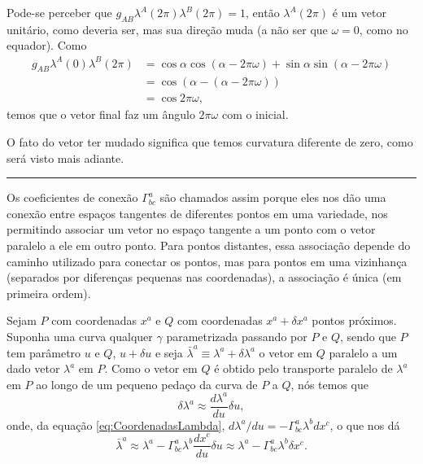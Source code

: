 \begin{exemplo}
Pode-se perceber que $g_{A B} \lambda^{A}(2 \pi) \lambda^{B}(2 \pi)=1$, então $\lambda^A(2\pi)$ é um vetor unitário, como deveria ser, mas sua direção muda (a não ser que $\omega=0$, como no equador). Como
\[
\begin{aligned} g_{A B} \lambda^{A}(0) \lambda^{B}(2 \pi) &=\cos \alpha \cos (\alpha-2 \pi \omega)+\sin \alpha \sin (\alpha-2 \pi \omega) \\ &=\cos (\alpha-(\alpha-2 \pi \omega)) \\ &=\cos 2 \pi \omega ,\end{aligned}
\]
temos que o vetor final faz um ângulo $2\pi\omega$ com o inicial.

O fato do vetor ter mudado significa que temos curvatura diferente de zero, como será visto mais adiante.

\noindent
\rule{\textwidth}{0.4pt}
\end{exemplo}

Os coeficientes de conexão $\Gamma^a_{bc}$ são chamados assim porque eles nos dão uma conexão entre espaços tangentes de diferentes pontos em uma variedade, nos permitindo associar um vetor no espaço tangente a um ponto com o vetor paralelo a ele em outro ponto. Para pontos distantes, essa associação depende do caminho utilizado para conectar os pontos, mas para pontos em uma vizinhança (separados por diferenças pequenas nas coordenadas), a associação é única (em primeira ordem).

Sejam $P$ com coordenadas $x^a$ e $Q$ com coordenadas $x^a+\delta x^a$ pontos próximos. Suponha uma curva qualquer $\gamma$ parametrizada passando por $P$ e $Q$, sendo que $P$ tem parâmetro $u$ e $Q$, $u+\delta u$ e seja $\bar{\lambda}^a\equiv\lambda^a + \delta\lambda^a$ o vetor em $Q$ paralelo a um dado vetor $\lambda^a$ em $P$. Como o vetor em $Q$ é obtido pelo transporte paralelo de $\lambda^a$ em $P$ ao longo de um pequeno pedaço da curva de $P$ a $Q$, nós temos que 
\[
	\delta \lambda^a \approx \frac{d\lambda^a}{du}\delta u,
\] 
onde, da equação \eqref{eq:CoordenadasLambda}, $d\lambda^a/du=-\Gamma^a_{bc}\lambda^bdx^c$, o que nos dá
\begin{equation}\label{eq:AproximacaoTransporteParalelo}
	\bar{\lambda}^a \approx \lambda^a - \Gamma^a_{bc}\lambda^b \frac{dx^c}{du}\delta u \approx \lambda^a - \Gamma^a_{bc}\lambda^b\delta x^c .
\end{equation}

